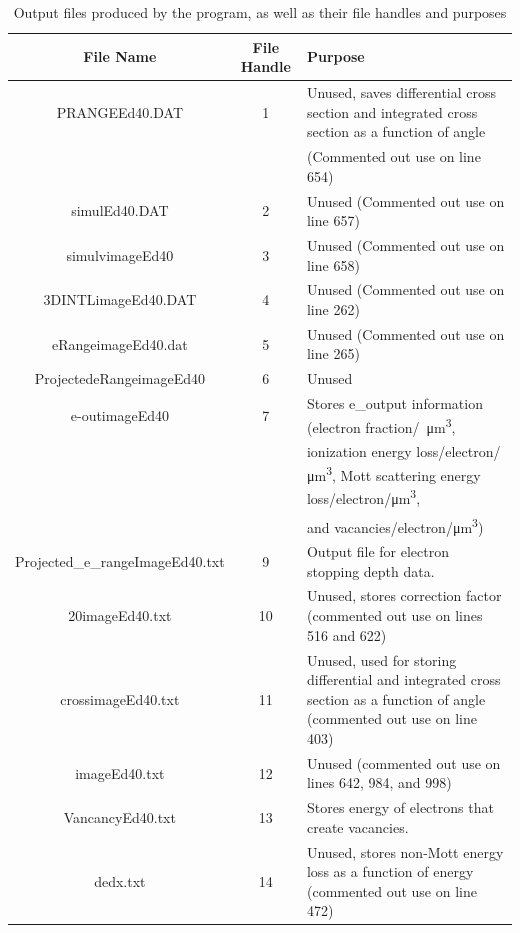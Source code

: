 \documentclass[10pt, reqno]{exam}
\begin{document}
\begin{table}[t]
    \footnotesize
    \centering
    \caption{Output files produced by the program, as well as their file handles and purposes}
    \label{tbl:output files}
    \begin{tabular}{|c|c|l|}
        \hline
        File Name & File Handle & Purpose \\
        \hline
        PRANGEEd40.DAT  & 1 & Unused, saves differential cross section and integrated cross section as a function of angle \\
        &&  (Commented out use on line 654)  \\
        simulEd40.DAT   & 2 & Unused (Commented out use on line 657)  \\
        simulvimageEd40 & 3 & Unused (Commented out use on line 658)  \\
        3DINTLimageEd40.DAT & 4 & Unused (Commented out use on line 262)  \\
        eRangeimageEd40.dat & 5 & Unused (Commented out use on line 265)  \\
        ProjectedeRangeimageEd40    & 6 & Unused  \\
        e-outimageEd40  & 7 & Stores e\_output information (electron fraction\si{/\micro\meter^3}, \\
        && ionization energy loss/\si{electron/\micro\meter^3}, Mott scattering energy loss/electron/\si{\micro\meter^3},\\
        &&  and vacancies/electron/\si{\micro\meter^3}) \\
        Projected\_e\_rangeImageEd40.txt  & 9 & Output file for electron stopping depth data.  \\
        20imageEd40.txt & 10 &  Unused, stores correction factor (commented out use on lines 516 and 622) \\
        crossimageEd40.txt  & 11 & Unused, used for storing differential and integrated cross section as a function of angle (commented out use on line 403) \\
        imageEd40.txt   & 12 & Unused (commented out use on lines 642, 984, and 998) \\
        VancancyEd40.txt    & 13 & Stores energy of electrons that create vacancies.  \\
        dedx.txt    & 14 & Unused, stores non-Mott energy loss as a function of energy (commented out use on line 472)  \\
        \hline
    \end{tabular}
\end{table}
\end{document}

